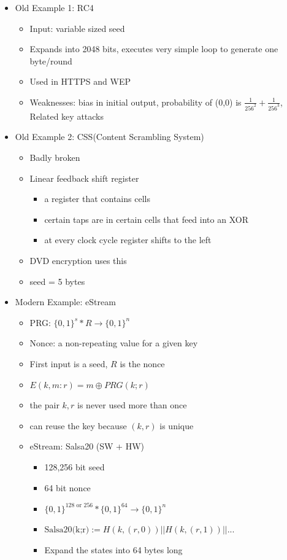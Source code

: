 \documentclass[]{article}
\begin{document}
\begin{itemize}
	\item Old Example 1: RC4
	\begin{itemize}
		\item Input: variable sized seed
		\item Expands into 2048 bits, executes very simple loop to generate one byte/round
		\item Used in HTTPS and WEP
		\item Weaknesses: bias in initial output, probability of (0,0) is $\frac{1}{{256}^{2}} + \frac{1}{{256}^{3}}$, Related key attacks
	\end{itemize}
	\item Old Example 2: CSS(Content Scrambling System)
	\begin{itemize}
		\item Badly broken
		\item Linear feedback shift register
		\begin{itemize}
			\item a register that contains cells
			\item certain taps are in certain cells that feed into an XOR
			\item at every clock cycle register shifts to the left
		\end{itemize}
		\item DVD encryption uses this
		\item seed = 5 bytes
	\end{itemize}
	\item Modern Example: eStream
	\begin{itemize}
		\item PRG: $\{0,1\}^{s} * R \rightarrow \{0,1\}^{n}$
		\item Nonce: a non-repeating value for a given key
		\item First input is a seed, $R$ is the nonce
		\item $E(k, m:r) = m \oplus PRG(k; r)$
		\item the pair $k,r$ is never used more than once
		\item can reuse the key because $(k,r)$ is unique
		\item eStream: Salsa20 (SW + HW)
		\begin{itemize}
			\item 128,256 bit seed
			\item 64 bit nonce
			\item $\{0,1\}^{128 \text{ or } 256} * \{0,1\}^{64} \rightarrow \{0,1\}^{n}$
			\item $\text{Salsa20(k;r)} := H(k, (r,0)) || H(k, (r,1)) || ...$
			\item Expand the states into 64 bytes long
		\end{itemize}
	\end{itemize}
\end{itemize}
\end{document}
